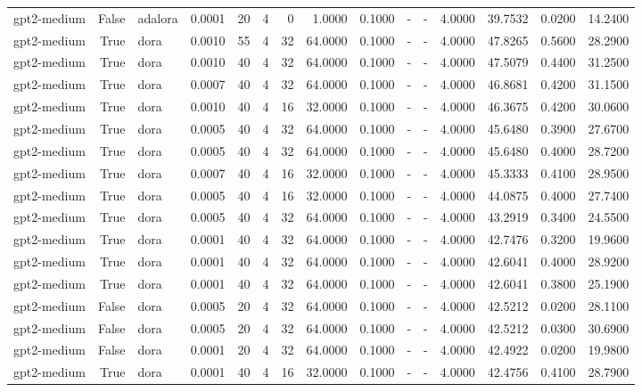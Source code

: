 \begin{tabular}{lrlrrrrrrlllrrr}
gpt2-medium & False & adalora & 0.0001 & 20 & 4 & 0 & 1.0000 & 0.1000 & - & - & 4.0000 & 39.7532 & 0.0200 & 14.2400 \\
gpt2-medium & True & dora & 0.0010 & 55 & 4 & 32 & 64.0000 & 0.1000 & - & - & 4.0000 & 47.8265 & 0.5600 & 28.2900 \\
gpt2-medium & True & dora & 0.0010 & 40 & 4 & 32 & 64.0000 & 0.1000 & - & - & 4.0000 & 47.5079 & 0.4400 & 31.2500 \\
gpt2-medium & True & dora & 0.0007 & 40 & 4 & 32 & 64.0000 & 0.1000 & - & - & 4.0000 & 46.8681 & 0.4200 & 31.1500 \\
gpt2-medium & True & dora & 0.0010 & 40 & 4 & 16 & 32.0000 & 0.1000 & - & - & 4.0000 & 46.3675 & 0.4200 & 30.0600 \\
gpt2-medium & True & dora & 0.0005 & 40 & 4 & 32 & 64.0000 & 0.1000 & - & - & 4.0000 & 45.6480 & 0.3900 & 27.6700 \\
gpt2-medium & True & dora & 0.0005 & 40 & 4 & 32 & 64.0000 & 0.1000 & - & - & 4.0000 & 45.6480 & 0.4000 & 28.7200 \\
gpt2-medium & True & dora & 0.0007 & 40 & 4 & 16 & 32.0000 & 0.1000 & - & - & 4.0000 & 45.3333 & 0.4100 & 28.9500 \\
gpt2-medium & True & dora & 0.0005 & 40 & 4 & 16 & 32.0000 & 0.1000 & - & - & 4.0000 & 44.0875 & 0.4000 & 27.7400 \\
gpt2-medium & True & dora & 0.0005 & 40 & 4 & 32 & 64.0000 & 0.1000 & - & - & 4.0000 & 43.2919 & 0.3400 & 24.5500 \\
gpt2-medium & True & dora & 0.0001 & 40 & 4 & 32 & 64.0000 & 0.1000 & - & - & 4.0000 & 42.7476 & 0.3200 & 19.9600 \\
gpt2-medium & True & dora & 0.0001 & 40 & 4 & 32 & 64.0000 & 0.1000 & - & - & 4.0000 & 42.6041 & 0.4000 & 28.9200 \\
gpt2-medium & True & dora & 0.0001 & 40 & 4 & 32 & 64.0000 & 0.1000 & - & - & 4.0000 & 42.6041 & 0.3800 & 25.1900 \\
gpt2-medium & False & dora & 0.0005 & 20 & 4 & 32 & 64.0000 & 0.1000 & - & - & 4.0000 & 42.5212 & 0.0200 & 28.1100 \\
gpt2-medium & False & dora & 0.0005 & 20 & 4 & 32 & 64.0000 & 0.1000 & - & - & 4.0000 & 42.5212 & 0.0300 & 30.6900 \\
gpt2-medium & False & dora & 0.0001 & 20 & 4 & 32 & 64.0000 & 0.1000 & - & - & 4.0000 & 42.4922 & 0.0200 & 19.9800 \\
gpt2-medium & True & dora & 0.0001 & 40 & 4 & 16 & 32.0000 & 0.1000 & - & - & 4.0000 & 42.4756 & 0.4100 & 28.7900 \\

\end{tabular}
